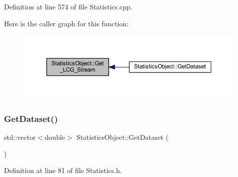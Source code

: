Definition at line 574 of file Statistics.\+cpp.

Here is the caller graph for this function\+:
\nopagebreak
\begin{figure}[H]
\begin{center}
\leavevmode
\includegraphics[width=350pt]{class_statistics_object_a983e11b6d3562ae303f5cc925be448e2_icgraph}
\end{center}
\end{figure}
\mbox{\label{class_statistics_object_a38f772ec93c2e0631cb101aff8296b54}} 
\subsubsection{\texorpdfstring{Get\+Dataset()}{GetDataset()}}
{\footnotesize\ttfamily std\+::vector$<$double$>$ Statistics\+Object\+::\+Get\+Dataset (\begin{DoxyParamCaption}{ }\end{DoxyParamCaption})\hspace{0.3cm}{\ttfamily [inline]}}



Definition at line 81 of file Statistics.\+h.

